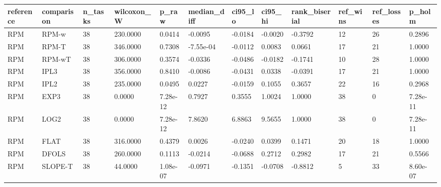 \begin{tabular}{llllllllllll}
\hline
reference & comparison & n\_tasks & wilcoxon\_W & p\_raw & median\_diff & ci95\_lo & ci95\_hi & rank\_biserial & ref\_wins & ref\_losses & p\_holm \\
\hline
RPM & RPM-w & 38 & 230.0000 & 0.0414 & -0.0095 & -0.0184 & -0.0020 & -0.3792 & 12 & 26 & 0.2896 \\
RPM & RPM-T & 38 & 346.0000 & 0.7308 & -7.55e-04 & -0.0112 & 0.0083 & 0.0661 & 17 & 21 & 1.0000 \\
RPM & RPM-wT & 38 & 306.0000 & 0.3574 & -0.0336 & -0.0486 & -0.0182 & -0.1741 & 10 & 28 & 1.0000 \\
RPM & IPL3 & 38 & 356.0000 & 0.8410 & -0.0086 & -0.0431 & 0.0338 & -0.0391 & 17 & 21 & 1.0000 \\
RPM & IPL2 & 38 & 235.0000 & 0.0495 & 0.0227 & -0.0159 & 0.1055 & 0.3657 & 22 & 16 & 0.2968 \\
RPM & EXP3 & 38 & 0.0000 & 7.28e-12 & 0.7927 & 0.3555 & 1.0024 & 1.0000 & 38 & 0 & 7.28e-11 \\
RPM & LOG2 & 38 & 0.0000 & 7.28e-12 & 7.8620 & 6.8863 & 9.5655 & 1.0000 & 38 & 0 & 7.28e-11 \\
RPM & FLAT & 38 & 316.0000 & 0.4379 & 0.0026 & -0.0240 & 0.0399 & 0.1471 & 20 & 18 & 1.0000 \\
RPM & DFOLS & 38 & 260.0000 & 0.1113 & -0.0214 & -0.0688 & 0.2712 & 0.2982 & 17 & 21 & 0.5566 \\
RPM & SLOPE-T & 38 & 44.0000 & 1.08e-07 & -0.0971 & -0.1351 & -0.0708 & -0.8812 & 5 & 33 & 8.60e-07 \\
\hline
\end{tabular}
